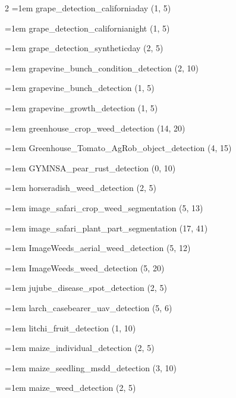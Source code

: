 \begin{multicols}{2}
\hangindent=1em grape\_\allowbreak{}detection\_\allowbreak{}californiaday (1, 5)\par
\hangindent=1em grape\_\allowbreak{}detection\_\allowbreak{}californianight (1, 5)\par
\hangindent=1em grape\_\allowbreak{}detection\_\allowbreak{}syntheticday (2, 5)\par
\hangindent=1em grapevine\_\allowbreak{}bunch\_\allowbreak{}condition\_\allowbreak{}detection (2, 10)\par
\hangindent=1em grapevine\_\allowbreak{}bunch\_\allowbreak{}detection (1, 5)\par
\hangindent=1em grapevine\_\allowbreak{}growth\_\allowbreak{}detection (1, 5)\par
\hangindent=1em greenhouse\_\allowbreak{}crop\_\allowbreak{}weed\_\allowbreak{}detection (14, 20)\par
\hangindent=1em Greenhouse\_\allowbreak{}Tomato\_\allowbreak{}AgRob\_\allowbreak{}object\_\allowbreak{}detection (4, 15)\par
\hangindent=1em GYMNSA\_\allowbreak{}pear\_\allowbreak{}rust\_\allowbreak{}detection (0, 10)\par
\hangindent=1em horseradish\_\allowbreak{}weed\_\allowbreak{}detection (2, 5)\par
\hangindent=1em image\_\allowbreak{}safari\_\allowbreak{}crop\_\allowbreak{}weed\_\allowbreak{}segmentation (5, 13)\par
\hangindent=1em image\_\allowbreak{}safari\_\allowbreak{}plant\_\allowbreak{}part\_\allowbreak{}segmentation (17, 41)\par
\hangindent=1em ImageWeeds\_\allowbreak{}aerial\_\allowbreak{}weed\_\allowbreak{}detection (5, 12)\par
\hangindent=1em ImageWeeds\_\allowbreak{}weed\_\allowbreak{}detection (5, 20)\par
\hangindent=1em jujube\_\allowbreak{}disease\_\allowbreak{}spot\_\allowbreak{}detection (2, 5)\par
\hangindent=1em larch\_\allowbreak{}casebearer\_\allowbreak{}uav\_\allowbreak{}detection (5, 6)\par
\hangindent=1em litchi\_\allowbreak{}fruit\_\allowbreak{}detection (1, 10)\par
\hangindent=1em maize\_\allowbreak{}individual\_\allowbreak{}detection (2, 5)\par
\hangindent=1em maize\_\allowbreak{}seedling\_\allowbreak{}msdd\_\allowbreak{}detection (3, 10)\par
\hangindent=1em maize\_\allowbreak{}weed\_\allowbreak{}detection (2, 5)\par

\end{multicols}
